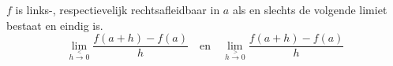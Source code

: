 \documentclass[main.tex]{subfiles}
\begin{document}
\begin{st}
  $f$ is links-, respectievelijk rechtsafleidbaar in $a$ als en slechts de volgende limiet bestaat en eindig is.
  \[ \lim_{h\overset{<}{\rightarrow} 0}\frac{f(a+h)-f(a)}{h} \quad\text{en}\quad \lim_{h\overset{>}{\rightarrow} 0}\frac{f(a+h)-f(a)}{h} \]
\end{st}
\end{document}
